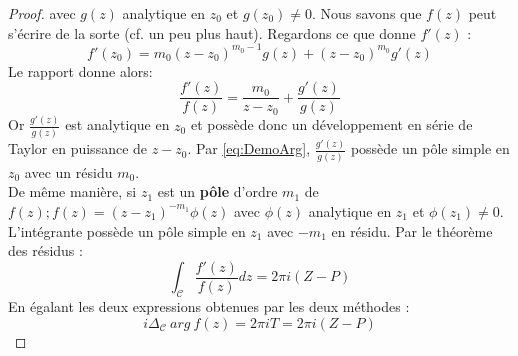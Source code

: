 \begin{proof}
	avec $g(z)$ analytique en $z_0$ et $g(z_0)\neq0$. Nous savons que $f(z)$ peut s'écrire de 
	la sorte (cf. un peu plus haut). Regardons ce que donne $f'(z)$ :
	\begin{equation}
		f'(z_0) =  m_0(z-z_0)^{m_0-1}g(z) + (z-z_0)^{m_0}g'(z)
	\end{equation}
	Le rapport donne alors:
	\begin{equation}
		\frac{f'(z)}{f(z)} = \frac{m_0}{z-z_0}+\frac{g'(z)}{g(z)}
		\label{eq:DemoArg}
	\end{equation}
	Or $\frac{g'(z)}{g(z)}$ est analytique en $z_0$ et possède donc un développement en série
	de Taylor en puissance de $z-z_0$. Par \autoref{eq:DemoArg}, $\frac{g'(z)}{g(z)}$ possède 
	un p\^ole simple en $z_0$ avec un résidu $m_0$.\\
	De même manière, si $z_1$ est un \textbf{pôle} d'ordre $m_1$ de $f(z) ; f(z) = (z-z_1)^{-m_1}\phi(
	z)$ avec $\phi(z)$ analytique en $z_1$ et $\phi(z_1)\neq0$. L'intégrante possède un pôle 
	simple en $z_1$ avec $-m_1$ en résidu. Par le théorème des résidus :
	\begin{equation}
		\int_\mathcal{C} \frac{f'(z)}{f(z)}dz = 2\pi i(Z-P)
	\end{equation}
	En égalant les deux expressions obtenues par les deux méthodes :
	\begin{equation}
		i\Delta_\mathcal{C}\ arg\ f(z) = 2\pi i T = 2\pi i (Z-P)
	\end{equation}
\end{proof}
        
        
        
        
        
        
        
        
        